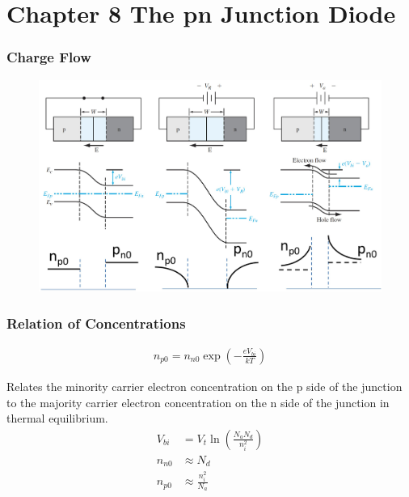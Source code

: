 \documentclass{beamer}
\begin{document}
\section{Chapter 8 The pn Junction Diode}
    \begin{frame} \frametitle{Charge Flow}
        \begin{figure}[H]
            \centering
            \includegraphics[width=\linewidth]{Charge-flow-in-pn-junction.jpg}
            \label{fig:Charge-flow-in-pn-junction.jpg}
        \end{figure}
    \end{frame}
    \begin{frame} \frametitle{Relation of Concentrations}
        \begin{equation*}
            \begin{aligned}
                n_{p0} = n_{n0} \exp\left( -\frac{e V_{bi} }{kT}  \right)
            \end{aligned}
        \end{equation*}
        \par Relates the minority carrier electron concentration on the p side of the junction to the majority carrier electron concentration on the n side of the junction in thermal equilibrium.
        \begin{equation*}
            \begin{aligned}
                V_{bi} &= V_t \ln \left( \frac{N_a N_d}{n_i^2}  \right)\\
                n_{n0} & \approx N_d \\
                n_{p0} & \approx \frac{n_i^2}{N_a}  \\
            \end{aligned}
        \end{equation*}
    \end{frame}
\end{document}
